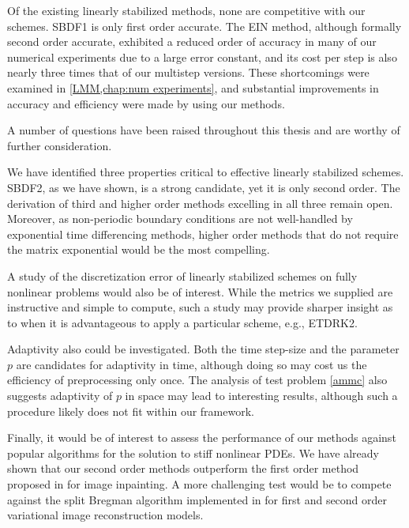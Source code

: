 Of the existing linearly stabilized methods, none are competitive with our schemes. 
SBDF1 is only first order accurate. The EIN method, although formally second order accurate, exhibited a reduced order of accuracy in many of our numerical experiments due to a large error constant, and its cost per step is also nearly three times that of our multistep versions. These shortcomings were examined in \cref{LMM,chap:num experiments}, and substantial improvements in accuracy and efficiency were made by using our methods.

A number of questions have been raised throughout this thesis and are worthy of further consideration. 

We have identified three properties critical to effective linearly stabilized schemes.  SBDF2, as we have shown, is a strong candidate, yet it is only second order. The derivation of third and higher order methods excelling in all three remain open. Moreover, as non-periodic boundary conditions are not well-handled by exponential time differencing methods, higher order methods that do not require the matrix exponential would be the most compelling.

A study of the discretization error of linearly stabilized schemes on fully nonlinear problems would also be of interest. While the metrics we supplied are instructive and simple to compute, such a study may provide sharper insight as to when it is advantageous to apply a particular scheme, e.g., ETDRK2. 

Adaptivity also could be investigated. Both the time step-size and the parameter $p$ are candidates for adaptivity in time, although doing so may cost us the efficiency of preprocessing only once. The analysis of test problem \cref{ammc} also suggests adaptivity of $p$ in space may lead to interesting results, although such a procedure likely does not fit within our framework. 

Finally, it would be of interest to assess the performance of our methods against popular algorithms for the solution to stiff nonlinear PDEs. We have already shown that our second order methods outperform the first order method proposed in \cite{schonlieb2011unconditionally} for image inpainting. A more challenging test would be to compete against the split Bregman algorithm \cite{goldstein2009split} implemented in \cite{papafitsoros2014combined,papafitsoros2013combined} for first and second order variational image reconstruction models. 
